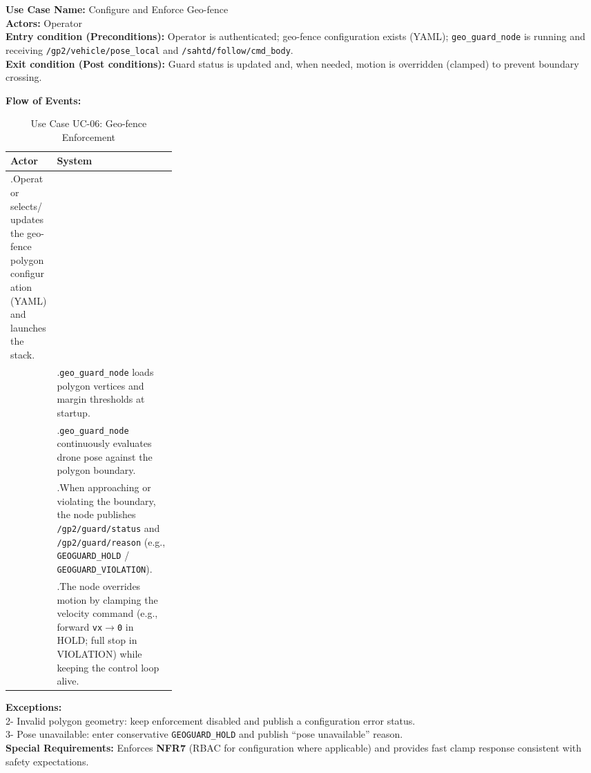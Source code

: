 \documentclass[12pt,a4paper]{report}
\begin{document}
\noindent\textbf{Use Case Name:} Configure and Enforce Geo-fence\\
\textbf{Actors:} Operator\\
\textbf{Entry condition (Preconditions):} Operator is authenticated; geo-fence configuration exists (\ac{YAML}); \texttt{geo\_guard\_node} is running and receiving \texttt{/gp2/vehicle/pose\_local} and \texttt{/sahtd/follow/cmd\_body}.\\
\textbf{Exit condition (Post conditions):} Guard status is updated and, when needed, motion is overridden (clamped) to prevent boundary crossing.

\noindent\textbf{Flow of Events:}
\begin{table}[H]
\centering
\caption{Use Case UC-06: Geo-fence Enforcement}
\label{tab:uc06_geofence}
\begin{tabularx}{\linewidth}{|>{\raggedright\arraybackslash}p{0.28\linewidth}|>{\raggedright\arraybackslash}X|}
\hline
\textbf{Actor} & \textbf{System} \\
\hline
1.\;Operator selects/updates the geo-fence polygon configuration (\ac{YAML}) and launches the stack. & \\ \hline
 & 2.\;\texttt{geo\_guard\_node} loads polygon vertices and margin thresholds at startup. \\ \hline
 & 3.\;\texttt{geo\_guard\_node} continuously evaluates drone pose against the polygon boundary. \\ \hline
 & 4.\;When approaching or violating the boundary, the node publishes \texttt{/gp2/guard/status} and \texttt{/gp2/guard/reason} (e.g., \texttt{GEOGUARD\_HOLD} / \texttt{GEOGUARD\_VIOLATION}). \\ \hline
 & 5.\;The node overrides motion by clamping the velocity command (e.g., forward \texttt{vx$\rightarrow$0} in HOLD; full stop in VIOLATION) while keeping the control loop alive. \\ \hline
\end{tabularx}
\end{table}

\vspace{0.5em}
\noindent\textbf{Exceptions:}\\
2- Invalid polygon geometry: keep enforcement disabled and publish a configuration error status.\\
3- Pose unavailable: enter conservative \texttt{GEOGUARD\_HOLD} and publish ``pose unavailable'' reason.\\

\noindent\textbf{Special Requirements:} Enforces \textbf{NFR7} (RBAC for configuration where applicable) and provides fast clamp response consistent with safety expectations.
\end{document}
